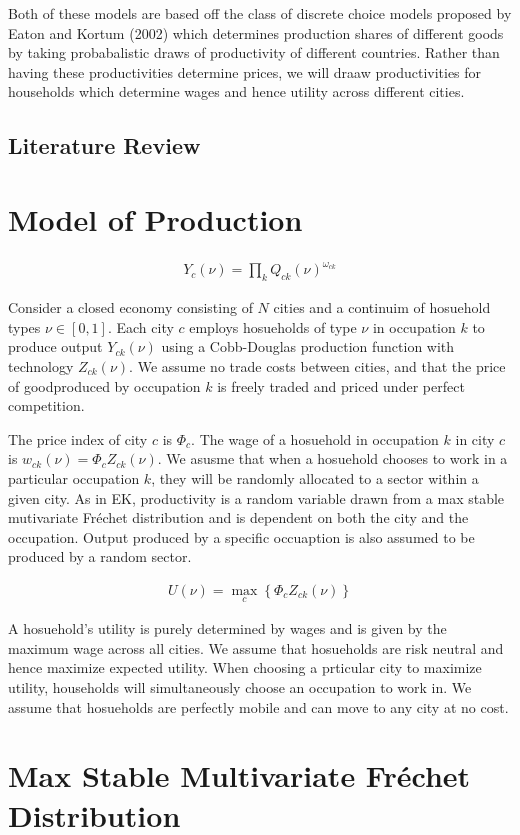 \documentclass[10pt]{article}
\begin{document}
Both of these models are based off the class of discrete choice models proposed by Eaton and Kortum (2002) which determines production shares of different goods by taking probabalistic draws of productivity of different countries. Rather than having these productivities determine prices, we will draaw productivities for households which determine wages and hence utility across different cities.

\subsection{Literature Review}

\section{Model of Production}

\begin{align}
    Y_{c} (\nu) = \prod_k Q_{ck} (\nu)^{\omega_{ck}}
\end{align}

Consider a closed economy consisting of $N$ cities and a continuim of hosuehold types $\nu \in [0, 1]$. Each city $c$ employs hosueholds of type $\nu$ in occupation $k$ to produce output $Y_{ck} (\nu)$ using a Cobb-Douglas production function with technology $Z_{ck} (\nu)$. We assume no trade costs between cities, and that the price of goodproduced by occupation $k$ is freely traded and priced under perfect competition.

The price index of city $c$ is $\Phi_c$. The wage of a hosuehold in occupation $k$ in city $c$ is $w_{ck} (\nu) = \Phi_c Z_{ck} (\nu)$. We asusme that when a hosuehold chooses to work in a particular occupation $k$, they will be randomly allocated to a sector within a given city. As in EK, productivity is a random variable drawn from a max stable mutivariate Fr\'{e}chet distribution and is dependent on both the city and the occupation. Output produced by a specific occuaption is also assumed to be produced by a random sector.

\begin{align}
    U (\nu) = \max_c \left\{ \Phi_c Z_{ck} (\nu) \right\}
\end{align}

A hosuehold's utility is purely determined by wages and is given by the maximum wage across all cities. We assume that hosueholds are risk neutral and hence maximize expected utility. When choosing a prticular city to maximize utility, households will simultaneously choose an occupation to work in. We assume that hosueholds are perfectly mobile and can move to any city at no cost.

\section{Max Stable Multivariate Fr\'{e}chet Distribution}
\end{document}
